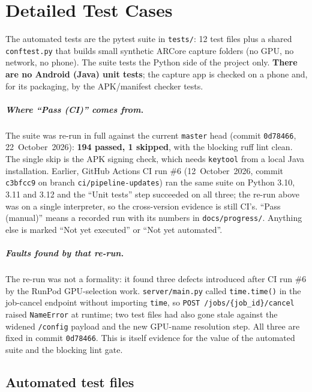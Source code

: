 \chapter{Detailed Test Cases}
\label{app:testcases}

The automated tests are the pytest suite in \texttt{tests/}: 12 test files plus a shared \texttt{conftest.py} that builds small synthetic ARCore capture folders (no GPU, no network, no phone). The suite tests the Python side of the project only. \textbf{There are no Android (Java) unit tests}; the capture app is checked on a phone and, for its packaging, by the APK/manifest checker tests.

\paragraph{Where ``Pass (CI)'' comes from.} The suite was re-run in full against the current \texttt{master} head (commit \texttt{0d78466}, 22~October~2026): \textbf{194 passed, 1 skipped}, with the blocking ruff lint clean. The single skip is the APK signing check, which needs \texttt{keytool} from a local Java installation. Earlier, GitHub Actions CI run \#6 (12~October~2026, commit \texttt{c3bfcc9} on branch \texttt{ci/pipeline-updates}) ran the same suite on Python 3.10, 3.11 and 3.12 and the ``Unit tests'' step succeeded on all three; the re-run above was on a single interpreter, so the cross-version evidence is still CI's. ``Pass (manual)'' means a recorded run with its numbers in \texttt{docs/progress/}. Anything else is marked ``Not yet executed'' or ``Not yet automated''.

\paragraph{Faults found by that re-run.} The re-run was not a formality: it found three defects introduced after CI run \#6 by the RunPod GPU-selection work. \texttt{server/main.py} called \texttt{time.time()} in the job-cancel endpoint without importing \texttt{time}, so \texttt{POST /jobs/\{job\_id\}/cancel} raised \texttt{NameError} at runtime; two test files had also gone stale against the widened \texttt{/config} payload and the new GPU-name resolution step. All three are fixed in commit \texttt{0d78466}. This is itself evidence for the value of the automated suite and the blocking lint gate.

\section{Automated test files}

